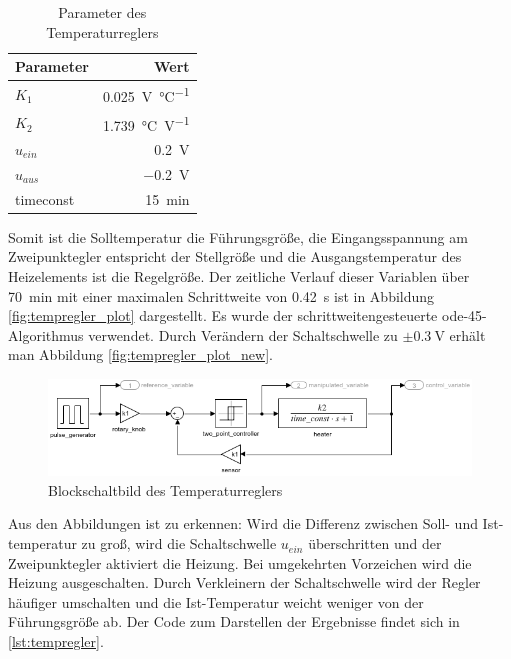 \documentclass[
    paper=a4,
    fontsize=10pt,
    DIV=12,
    oneside,
]{scrartcl}
\begin{document}
    \begin{table}[hbt]
        \centering
        \caption{Parameter des Temperaturreglers}
        \label{tab:tempregler}
        \begin{tabular}{lr}\toprule
            Parameter   &   Wert\\\midrule
            \(K_1\)     & \SI{0.025}{\volt\per\celsius}\\\addlinespace
            \(K_2\)     & \SI{1,739}{\celsius\per\volt}\\\addlinespace
            \(u_{ein}\) & \SI{0.2}{\volt}\\
            \(u_{aus}\) & \SI{-0.2}{\volt}\\
            timeconst   & \SI{15}{\minute}\\\bottomrule
        \end{tabular}
    \end{table}
    
    Somit ist die Solltemperatur die Führungsgröße, die Eingangsspannung am Zweipunktegler entspricht der Stellgröße und die Ausgangstemperatur des Heizelements ist die Regelgröße. Der zeitliche Verlauf dieser Variablen über \SI{70}{\minute} mit einer maximalen Schrittweite von \SI{0.42}{\second} ist in Abbildung \ref{fig:tempregler_plot} dargestellt. Es wurde der schrittweitengesteuerte ode-45-Algorithmus verwendet. Durch Verändern der Schaltschwelle zu  \(\pm\SI{0.3}{\volt}\) erhält man Abbildung \ref{fig:tempregler_plot_new}.

    \begin{figure}[hbt]
        \centering
        \includegraphics[width=1.3\imagewidth]{../versuch1/tempregler_block.png}
        \caption{Blockschaltbild des Temperaturreglers}
        \label{fig:tempregler_block}
    \end{figure}    

    Aus den Abbildungen ist zu erkennen: Wird die Differenz zwischen Soll- und Ist-temperatur zu groß, wird die Schaltschwelle \(u_{ein}\) überschritten und der Zweipunktegler aktiviert die Heizung. Bei umgekehrten Vorzeichen wird die Heizung ausgeschalten. Durch Verkleinern der Schaltschwelle wird der Regler häufiger umschalten und die Ist-Temperatur weicht weniger von der Führungsgröße ab. Der Code zum Darstellen der Ergebnisse findet sich in \ref{lst:tempregler}.
\end{document}
